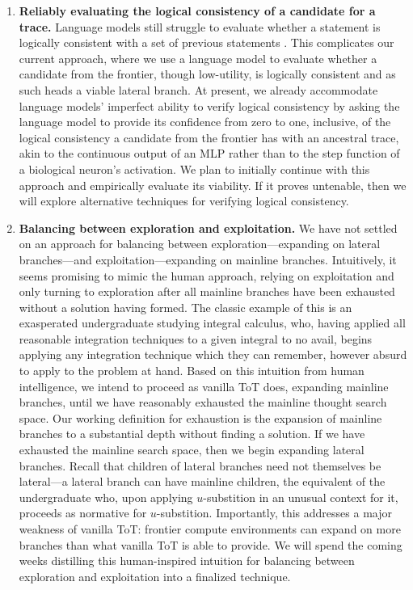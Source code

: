 \documentclass[onecolumn]{IEEEtran}
\begin{document}
\begin{enumerate}
    \item
        \textbf{Reliably evaluating the logical consistency of a candidate for a trace.}
        Language models still struggle to evaluate whether a statement is logically consistent with a set of previous statements \cite{ghosh2025logical,liu2025logicalconsistency,chen2025justlogic,wan2024logicasker}.
        This complicates our current approach, where we use a language model to evaluate whether a candidate from the frontier, though low-utility, is logically consistent and as such heads a viable lateral branch.
        At present, we already accommodate language models' imperfect ability to verify logical consistency by asking the language model to provide its confidence from zero to one, inclusive, of the logical consistency a candidate from the frontier has with an ancestral trace, akin to the continuous output of an MLP rather than to the step function of a biological neuron's activation.
        We plan to initially continue with this approach and empirically evaluate its viability.
        If it proves untenable, then we will explore alternative techniques for verifying logical consistency.
    \item
        \textbf{Balancing between exploration and exploitation.}
        We have not settled on an approach for balancing between exploration---expanding on lateral branches---and exploitation---expanding on mainline branches.
        Intuitively, it seems promising to mimic the human approach, relying on exploitation and only turning to exploration after all mainline branches have been exhausted without a solution having formed.
        The classic example of this is an exasperated undergraduate studying integral calculus, who, having applied all reasonable integration techniques to a given integral to no avail, begins applying any integration technique which they can remember, however absurd to apply to the problem at hand.
        Based on this intuition from human intelligence, we intend to proceed as vanilla ToT does, expanding mainline branches, until we have reasonably exhausted the mainline thought search space.
        Our working definition for exhaustion is the expansion of mainline branches to a substantial depth without finding a solution.
        If we have exhausted the mainline search space, then we begin expanding lateral branches.
        Recall that children of lateral branches need not themselves be lateral---a lateral branch can have mainline children, the equivalent of the undergraduate who, upon applying $u$-substition in an unusual context for it, proceeds as normative for $u$-substition.
        Importantly, this addresses a major weakness of vanilla ToT: frontier compute environments can expand on more branches than what vanilla ToT is able to provide.
        We will spend the coming weeks distilling this human-inspired intuition for balancing between exploration and exploitation into a finalized technique.
\end{enumerate}
\end{document}
